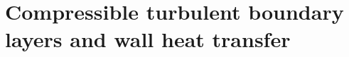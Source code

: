 \section{Compressible turbulent boundary layers and wall heat transfer}
\label{sec:background:turbulent-boundary-layers-wall-heat-transfer}
